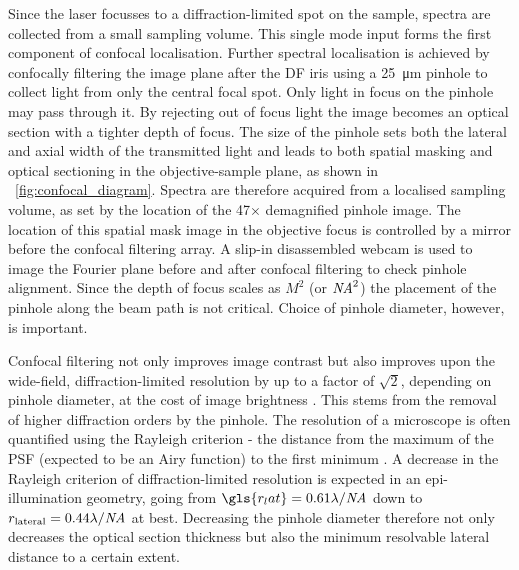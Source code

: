 \documentclass{article}
\begin{document}
Since the laser focusses to a diffraction-limited spot on the sample, spectra are collected from a small sampling volume. This single mode input forms the first component of confocal localisation. Further spectral localisation is achieved by confocally filtering the image plane after the DF iris using a \SI{25}{\micro\metre} pinhole to collect light from only the central focal spot. Only light in focus on the pinhole may pass through it. By rejecting out of focus light the image becomes an optical section with a tighter depth of focus. The size of the pinhole sets both the lateral and axial width of the transmitted light and leads to both spatial masking and optical sectioning in the objective-sample plane, as shown in \figurename~\ref{fig:confocal_diagram}. Spectra are therefore acquired from a localised sampling volume, as set by the location of the 47$\times$ demagnified pinhole image. The location of this spatial mask image in the objective focus is controlled by a mirror before the confocal filtering array. A slip-in disassembled webcam is used to image the Fourier plane before and after confocal filtering to check pinhole alignment. Since the depth of focus scales as $M^2$ (or $\mathit{NA}^2$) the placement of the pinhole along the beam path is not critical. Choice of pinhole diameter, however, is important.

Confocal filtering not only improves image contrast but also improves upon the wide-field, diffraction-limited resolution by up to a factor of $\sqrt{2}$, depending on pinhole diameter, at the cost of image brightness \cite{webb1996confocal, murphy2002fundamentals, cox2004practical, hollricher2011high}. This stems from the removal of higher diffraction orders by the pinhole. The resolution of a microscope is often quantified using the Rayleigh criterion - the distance from the maximum of the PSF (expected to be an Airy function) to the first minimum  \cite{born1999principles}. A decrease in the Rayleigh criterion of diffraction-limited resolution is expected in an epi-illumination geometry, going from $\gls{r_lat}=0.61\lambda/\NA$ down to $r_{\mathrm{lateral}}=0.44\lambda/\mathit{NA}$ at best.
Decreasing the pinhole diameter therefore not only decreases the optical section thickness but also the minimum resolvable lateral distance to a certain extent.
\end{document}
